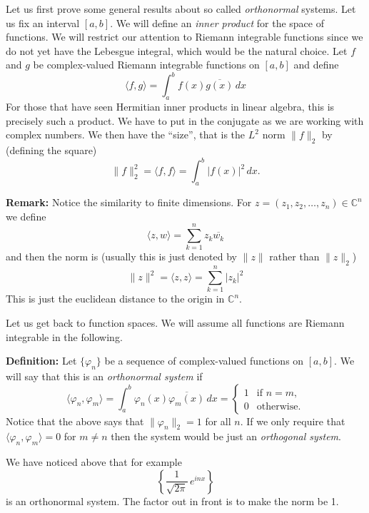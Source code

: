 \documentclass[12pt]{book}
\newcommand{\snorm}[1]{\lVert {#1} \rVert}
\newcommand{\abs}[1]{\left\lvert {#1} \right\rvert}
\newcommand{\C}{{\mathbb{C}}}
\theoremstyle{plain}
\theoremstyle{remark}
\theoremstyle{definition}
\theoremstyle{exercise}
\theoremstyle{example}
\begin{document}
\medskip

Let us first prove some general results about so called \emph{orthonormal}
systems.  Let us fix an interval $[a,b]$.  We will define an \emph{inner
product} for the space of functions.  We will restrict our attention
to Riemann integrable functions since we do not yet have the Lebesgue
integral, which
would be the natural choice.  Let $f$ and $g$ be complex-valued 
Riemann integrable functions on $[a,b]$ and define
$$
\langle f , g \rangle =
\int_a^b f(x) \overline{g(x)} \, dx
$$
For those that have seen Hermitian inner products in linear algebra, this
is precisely such a product.  We have to put in the conjugate as we are
working with complex numbers.  We then have the ``size'', that is the
$L^2$ norm $\snorm{f}_2$ by (defining the square)
$$
\snorm{f}_2^2 =
\langle f , f \rangle =
\int_a^b \abs{f(x)}^2 \, dx .
$$

\medskip

\textbf{Remark:}
Notice the similarity to finite dimensions.  For $z = (z_1,z_2,\ldots,z_n) \in 
\C^n$ we define 
$$
\langle z , w \rangle =
\sum_{k=1}^n z_k \overline{w_k}
$$
and then the norm is (usually this is just denoted by $\snorm{z}$ rather than
$\snorm{z}_2$)
$$
\snorm{z}^2 = 
\langle z , z \rangle =
\sum_{k=1}^n \abs{z_k}^2
$$
This is just the euclidean distance to the origin in $\C^n$.

\medskip

Let us get back to function spaces.  We will assume all functions are
Riemann integrable in the following.

\medskip

\textbf{Definition:}
Let $\{ \varphi_n \}$ be a sequence of complex-valued
functions on $[a,b]$.  We will say that this is an \emph{orthonormal system} if
$$
\langle \varphi_n , \varphi_m \rangle
=
\int_a^b \varphi_n(x) \overline{\varphi_m(x)} \, dx
= 
\begin{cases}
1 & \text{if $n=m$,} \\
0 & \text{otherwise.}
\end{cases}
$$
Notice that the above says that $\snorm{\varphi_n}_2 = 1$ for all $n$.  If we
only require that 
$\langle \varphi_n , \varphi_m \rangle = 0$ for $m\not= n$ then
the system would be just an \emph{orthogonal system}.

\medskip

We have noticed above that for example
$$
\left\{ \frac{1}{\sqrt{2\pi}} \, e^{inx} \right\}
$$
is an orthonormal system.  The factor out in front is to make the norm be 1.
\end{document}
